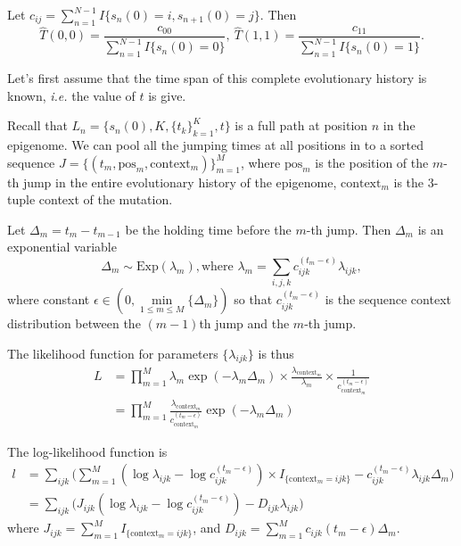 \documentclass[11pt]{article}
\begin{document}
Let $c_{ij} = \sum_{n=1}^{N-1}I\{s_n(0) =i, s_{n+1}(0)=j\}$. Then 
\[ \hat{T}(0, 0) = \frac{c_{00}}{\sum_{n=1}^{N-1}I\{s_n(0) = 0\}}, ~ 
\hat{T}(1,1) = \frac{c_{11}}{\sum_{n=1}^{N-1}I\{s_n(0) = 1\}}.
\]

Let's first assume that the time span of this complete evolutionary
history is known, \textit{i.e.} the value of $t$ is give.

Recall that $L_n = \{s_n(0), K, \{t_k\}_{k=1}^K, t\}$ is a full path
at position $n$ in the epigenome. We can pool all the jumping times at
all positions in to a sorted sequence $J = \{(t_m, \text{pos}_m,
\text{context}_m) \}_{m=1}^{M}$, where $\text{pos}_m$ is the position of the
$m$-th jump in the entire evolutionary history of the epigenome,
$\text{context}_m$ is the 3-tuple context of the mutation.

Let $\Delta_m = t_m - t_{m-1}$ be the holding time before the $m$-th
jump. Then $\Delta_m$ is an exponential variable 
\[
\Delta_m \sim \text{Exp}(\lambda_m), \text{where } \lambda_m = \sum\limits_{i,j,k}c_{ijk}^{(t_m - \epsilon)}\lambda_{ijk},
\]
where constant 
$\epsilon \in (0, \min\limits_{1\le m \le M}\{\Delta_{m}\})$ so that 
$c_{ijk}^{(t_m - \epsilon)}$ is the sequence
context distribution between the $(m-1)$th jump and the $m$-th jump.

The likelihood function for parameters $\{\lambda_{ijk}\}$ is thus
\begin{equation}\label{eqn:lik}
\begin{aligned}
L &= \prod\limits_{m=1}^{M} \lambda_m \exp(-\lambda_m\Delta_m) \times \frac{\lambda_{\text{context}_m}}{\lambda_m} \times \frac{1}{c_{\text{context}_m}^{(t_m-\epsilon)}}\\
&=\prod\limits_{m=1}^{M}\frac{\lambda_{\text{context}_m}}{c_{\text{context}_m}^{(t_m-\epsilon)}}\exp(-\lambda_m\Delta_m)
\end{aligned}
\end{equation}

The log-likelihood function is 
\begin{equation}\label{eqn:loglik1}
\begin{aligned}
l & = \sum\limits_{ijk} \big( 
\sum_{m=1}^M{(\log\lambda_{ijk} - \log c_{ijk}^{(t_m-\epsilon)})\times I_{\{ \text{context}_m = ijk\}} - c_{ijk}^{(t_m-\epsilon)}\lambda_{ijk}\Delta_m } \big) \\
& = \sum\limits_{ijk} \big(J_{ijk}(\log\lambda_{ijk} - \log c_{ijk}^{(t_m-\epsilon)}) - D_{ijk}\lambda_{ijk} \big)
\end{aligned}
\end{equation}
where $J_{ijk} = \sum_{m=1}^M I_{\{\text{context}_m = ijk\}}$, and $D_{ijk} = \sum_{m=1}^Mc_{ijk}(t_m-\epsilon)\Delta_m$.
\end{document}
